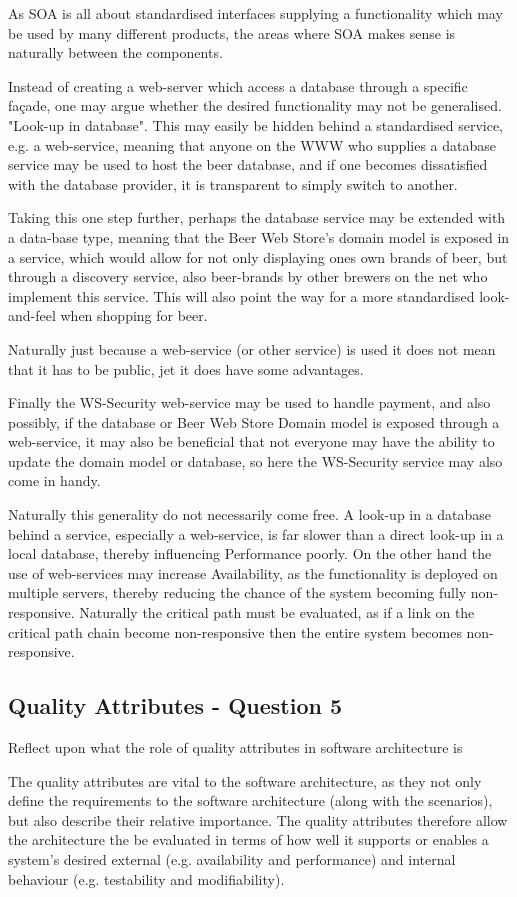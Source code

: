 As SOA is all about standardised interfaces supplying a functionality which may be used by many different products, the areas where SOA makes sense is naturally between the components. 

Instead of creating a web-server which access a database through a specific fa\c cade, one may argue whether the desired functionality may not be generalised. "Look-up in database". This may easily be hidden behind a standardised service, e.g. a web-service, meaning that anyone on the WWW who supplies a database service may be used to host the beer database, and if one becomes dissatisfied with the database provider, it is transparent to simply switch to another. 

Taking this one step further, perhaps the database service may be extended with a data-base type, meaning that the Beer Web Store's domain model is exposed in a service, which would allow for not only displaying ones own brands of beer, but through a discovery service, also beer-brands by other brewers on the net who implement this service. This will also point the way for a more standardised look-and-feel when shopping for beer.

Naturally just because a web-service (or other service) is used it does not mean that it has to be public, jet it does have some advantages.

Finally the WS-Security web-service may be used to handle payment, and also possibly, if the database or Beer Web Store Domain model is exposed through a web-service, it may also be beneficial that not everyone may have the ability to update the domain model or database, so here the WS-Security service may also come in handy.

Naturally this generality do not necessarily come free. A look-up in a database behind a service, especially a web-service, is far slower than a direct look-up in a local database, thereby influencing Performance poorly. On the other hand the use of web-services may increase Availability, as the functionality is deployed on multiple servers, thereby reducing the chance of the system becoming fully non-responsive. Naturally the critical path must be evaluated, as if a link on the critical path chain become non-responsive then the entire system becomes non-responsive.

\subsection{Quality Attributes - Question 5}

\begin{question}
Reflect upon what the role of quality attributes in software
architecture is
\end{question}

The quality attributes are vital to the software architecture, as they not only define the requirements to the software architecture (along with the scenarios), but also describe their relative importance. The quality attributes therefore allow the architecture the be evaluated in terms of how well it supports or enables a system's desired external (e.g. availability and performance) and internal behaviour (e.g. testability and modifiability). \cite{h_sarjoughian2002}
